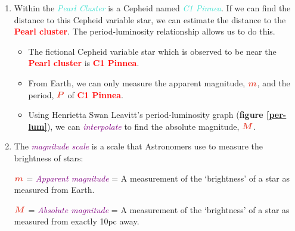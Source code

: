 \documentclass{article}
\begin{document}
\begin{tcolorbox}
\begin{tcolorbox}[enhanced jigsaw,breakable,pad at break*=1mm,colback=red!5!white,colframe=red!75!white,colbacktitle=red!75!white,title=\textbf{We can explore this relationship further.},drop fuzzy shadow]
                    \renewcommand{\theenumi}{\Roman{enumi}}
                    \begin{enumerate}
                        \item Within the \emph{\textcolor{turquoise}{Pearl Cluster}} is a Cepheid named \emph{\textcolor{turquoise}{C1 Pinnea}}. If we can find the distance to this Cepheid variable star, we can estimate the distance to the \textbf{\textcolor{red}{Pearl cluster}}. The period-luminosity relationship allows us to do this.
                        
                        \begin{itemize}
                            \item The fictional Cepheid variable star which is observed to be near the \textbf{\textcolor{red}{Pearl cluster}} is \textbf{\textcolor{red}{C1 Pinnea}}.
                            \item From Earth, we can only measure the apparent magnitude, $ \textcolor{red}{\boldsymbol{m}} $, and the period, $ \textcolor{red}{\boldsymbol{P}} $ of \textbf{\textcolor{red}{C1 Pinnea}}.
                            
                            \item Using Henrietta Swan Leavitt's period-luminosity graph (\textbf{figure \ref{per-lum}}), we can \emph{\textcolor{purple}{interpolate}} to find the absolute magnitude, $ \textcolor{red}{\boldsymbol{M}} $.
                        \end{itemize}
                        
                        
                        \item The \emph{\textcolor{purple}{magnitude scale}} is a scale that Astronomers use to measure the brightness of stars:\\

                                \begin{center}
                               
                                    $ \textcolor{red}{\boldsymbol{m}} $ = {\emph{\textcolor{purple}{Apparent magnitude}}} = A measurement of the ‘brightness' of a star as measured from Earth.

                                    $ \textcolor{red}{\boldsymbol{M}} $ = {\emph{\textcolor{purple}{Absolute magnitude}}} = A measurement of the ‘brightness' of a star as measured from exactly 10pc away.

                                \end{center}
                            

\end{enumerate}
\end{tcolorbox}
\end{tcolorbox}
\end{document}
